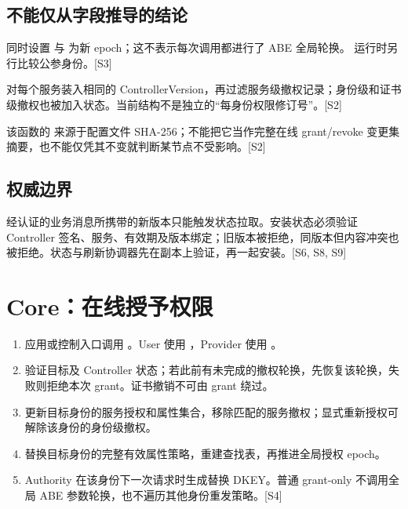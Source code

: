 \subsection{不能仅从字段推导的结论}
 同时设置  与
 为新 epoch；这不表示每次调用都进行了 ABE 全局轮换。
运行时另行比较公参身份。[S3]

 对每个服务装入相同的 ControllerVersion，再过滤服务级撤权记录；身份级和证书级撤权也被加入状态。当前结构不是独立的“每身份权限修订号”。[S2]

该函数的  来源于配置文件 SHA-256；不能把它当作完整在线 grant/revoke 变更集摘要，也不能仅凭其不变就判断某节点不受影响。[S2]

\subsection{权威边界}
经认证的业务消息所携带的新版本只能触发状态拉取。安装状态必须验证 Controller 签名、服务、有效期及版本绑定；旧版本被拒绝，同版本但内容冲突也被拒绝。状态与刷新协调器先在副本上验证，再一起安装。[S6, S8, S9]


\newpage

\section{Core：在线授予权限}
\begin{enumerate}
\item 应用或控制入口调用 。User 使用 ，Provider 使用 。
\item 验证目标及 Controller 状态；若此前有未完成的撤权轮换，先恢复该轮换，失败则拒绝本次 grant。证书撤销不可由 grant 绕过。
\item 更新目标身份的服务授权和属性集合，移除匹配的服务撤权；显式重新授权可解除该身份的身份级撤权。
\item 替换目标身份的完整有效属性策略，重建查找表，再推进全局授权 epoch。
\item Authority 在该身份下一次请求时生成替换 DKEY。普通 grant-only 不调用全局 ABE 参数轮换，也不遍历其他身份重发策略。[S4]
\end{enumerate}

